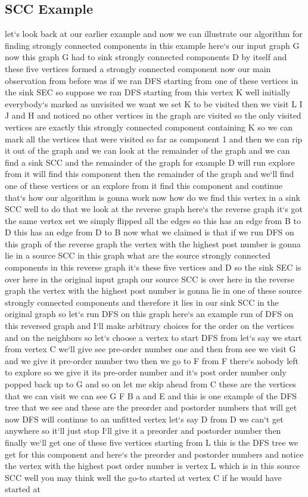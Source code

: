 \subsection{SCC Example}
let`s look back at our earlier example and now we can illustrate our algorithm for finding strongly connected components in this example here`s our input graph G now this graph G had to sink strongly connected components D by itself and these five vertices formed a strongly connected component now our main observation from before was if we ran DFS starting from one of these vertices in the sink SEC so suppose we ran DFS starting from this vertex K well initially everybody`s marked as unvisited we want we set K to be visited then we visit L I J and H and noticed no other vertices in the graph are visited so the only visited vertices are exactly this strongly connected component containing K so we can mark all the vertices that were visited so far as component 1 and then we can rip it out of the graph and we can look at the remainder of the graph and we can find a sink SCC and the remainder of the graph for example D will run explore from it will find this component then the remainder of the graph and we`ll find one of these vertices or an explore from it find this component and continue that`s how our algorithm is gonna work now how do we find this vertex in a sink SCC well to do that we look at the reverse graph here`s the reverse graph it`s got the same vertex set we simply flipped all the edges so this has an edge from B to D this has an edge from D to B now what we claimed is that if we run DFS on this graph of the reverse graph the vertex with the highest post number is gonna lie in a source SCC in this graph what are the source strongly connected components in this reverse graph it`s these five vertices and D so the sink SEC is over here in the original input graph our source SCC is over here in the reverse graph the vertex with the highest post number is gonna lie in one of these source strongly connected components and therefore it lies in our sink SCC in the original graph so let`s run DFS on this graph here`s an example run of DFS on this reversed graph and I`ll make arbitrary choices for the order on the vertices and on the neighbors so let`s choose a vertex to start DFS from let`s say we start from vertex C we`ll give see pre-order number one and then from see we visit G and we give it pre-order number two then we go to F from F there`s nobody left to explore so we give it its pre-order number and it`s post order number only popped back up to G and so on let me skip ahead from C these are the vertices that we can visit we can see G F B a and E and this is one example of the DFS tree that we see and these are the preorder and postorder numbers that will get now DFS will continue to an unfitted vertex let`s say D from D we can`t get anywhere so it`ll just stop I`ll give it a preorder and postorder number then finally we`ll get one of these five vertices starting from L this is the DFS tree we get for this component and here`s the preorder and postorder numbers and notice the vertex with the highest post order number is vertex L which is in this source SCC well you may think well the go-to started at vertex C if he would have started at 